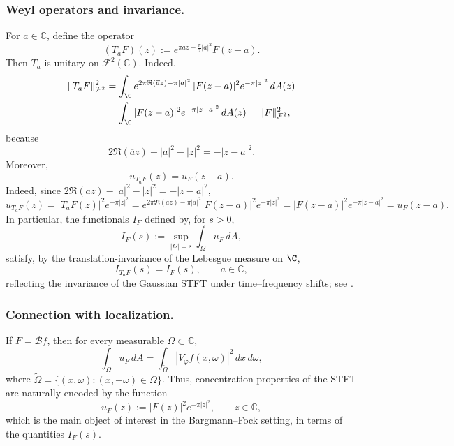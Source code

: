 \subsubsection*{Weyl operators and invariance.}
For $a \in \mathbb{C}$, define the operator
\begin{equation}\label{eq:Ta}
(T_a F)(z) := e^{\pi \overline{a} z - \frac{\pi}{2}|a|^2} F(z - a).
\end{equation}
Then $T_a$ is unitary on $\mathcal{F}^2(\mathbb{C})$. Indeed,
\begin{align*}
\|T_aF\|_{\mathcal F^2}^2
&=
\int_{\C} e^{2\pi \Re(\overline{a}z)-\pi |a|^2}\,|F(z-a)|^2 e^{-\pi |z|^2}\,dA(z) \\
&=
\int_{\C} |F(z-a)|^2 e^{-\pi |z-a|^2}\,dA(z)
=
\|F\|_{\mathcal F^2}^2,
\end{align*}
because
\[
2\Re(\overline{a}z)-|a|^2-|z|^2=-|z-a|^2.
\]
Moreover,
\begin{equation}\label{eq:uF-translate}
u_{T_a F}(z) = u_F(z - a).
\end{equation}
Indeed, since
\(2\Re(\overline{a}z)-|a|^2-|z|^2 = -|z-a|^2\),
\begin{equation}\label{eq:u-translation-global}
u_{T_aF}(z)
=
|T_aF(z)|^2e^{-\pi |z|^2}
=
e^{2\pi\Re(\overline{a}z)-\pi|a|^2}|F(z-a)|^2e^{-\pi |z|^2}
=
|F(z-a)|^2e^{-\pi |z-a|^2}=u_F(z-a).
\end{equation}
In particular, the functionals $I_F$ defined by,
for \(s>0\),
\[
I_F(s):=\sup_{|\Omega|=s}\int_\Omega u_F\,dA,
\]
satisfy, by the translation-invariance of the Lebesgue measure on \(\C\),
\begin{equation}\label{eq:I-translation-global}
I_{T_a F}(s) = I_F(s), \qquad a \in \mathbb{C},
\end{equation}
reflecting the invariance of the Gaussian STFT under time--frequency shifts;
see \cite{Daubechies,Grochenig,Kulikov-Oliveira-Ramos,Goncalves-Oliveira-Steinerberger}.

\medskip

\noindent
\subsubsection*{Connection with localization.}
If $F = \mathcal{B}f$, then for every measurable $\Omega \subset \mathbb{C}$,
\[
\int_\Omega u_F \, dA
= \int_{\widetilde{\Omega}} |V_\varphi f(x,\omega)|^2 \, dx\, d\omega,
\]
where $\widetilde{\Omega} = \{(x,\omega) : (x,-\omega) \in \Omega\}$.
Thus, concentration properties of the STFT are naturally encoded by the function
\begin{equation}\label{eq:uF}
u_F(z) := |F(z)|^2 e^{-\pi |z|^2}, \qquad z \in \mathbb{C},
\end{equation}
which is the main object of interest in the Bargmann--Fock setting, in terms of the
quantities $I_F(s)$.

